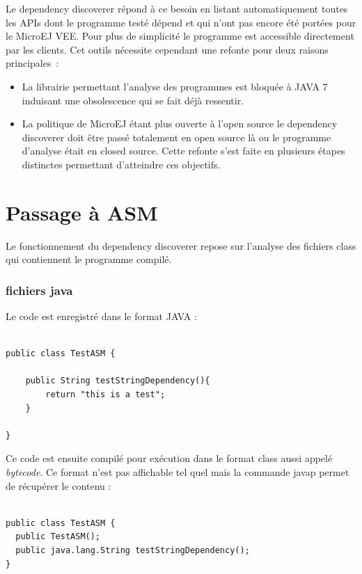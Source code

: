 \documentclass[french,a4paper,12pt]{report}
\begin{document}
Le dependency discoverer répond à ce besoin en listant automatiquement toutes les APIs dont le programme testé dépend et qui n’ont pas encore été portées pour le MicroEJ VEE. Pour plus de simplicité le programme est accessible directement par les clients. Cet outils nécessite cependant une refonte pour deux raisons principales :
\begin{itemize}

\item La librairie permettant l’analyse des programmes est bloquée à JAVA 7 induisant une obsolescence qui se fait déjà ressentir.

\item La politique de MicroEJ étant plus ouverte à l’open source le dependency discoverer doit être passé totalement en open source là ou le programme d’analyse était en closed source.
Cette refonte s’est faite en plusieurs étapes distinctes permettant d’atteindre ces objectifs.

\end{itemize}

\section{Passage à ASM }

Le fonctionnement du dependency discoverer repose sur l'analyse des fichiers class qui contiennent le programme compilé. 

\bigskip

\subsubsection{fichiers java}

Le code est enregistré dans le format JAVA :

\begin{lstlisting}

public class TestASM {
	
	public String testStringDependency(){
		return "this is a test";
	}
	
}

\end{lstlisting}

Ce code est ensuite compilé pour exécution dans le format class aussi appelé \textit{bytecode}. Ce format n'est pas affichable tel quel mais la commande javap permet de récupérer le contenu :

\begin{lstlisting}

public class TestASM {
  public TestASM();
  public java.lang.String testStringDependency();
}


\end{lstlisting}
\end{document}
